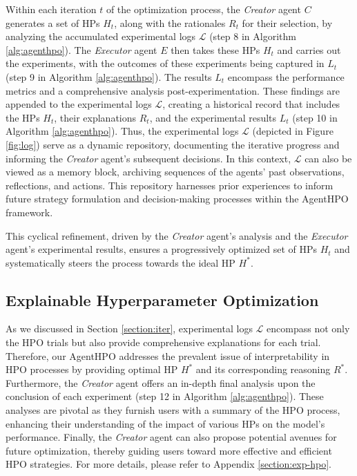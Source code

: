 \documentclass{article}
\begin{document}
Within each iteration \( t \) of the optimization process, the \textit{Creator} agent \( C \) generates a set of HPs \( H_t \), along with the rationales \( R_t \) for their selection, by analyzing the accumulated experimental logs \( \mathcal{L} \) (step 8 in Algorithm \ref{alg:agenthpo}). The \textit{Executor} agent \( E \) then takes these HPs \( H_t \) and carries out the experiments, with the outcomes of these experiments being captured in \( L_t \) (step 9 in Algorithm \ref{alg:agenthpo}). The results \( L_t \) encompass the performance metrics and a comprehensive analysis post-experimentation. These findings are appended to the experimental logs \( \mathcal{L} \), creating a historical record that includes the HPs \( H_t \), their explanations \( R_t \), and the experimental results \( L_t \) (step 10 in Algorithm \ref{alg:agenthpo}). Thus, the experimental logs \( \mathcal{L} \) (depicted in Figure \ref{fig:log}) serve as a dynamic repository, documenting the iterative progress and informing the \textit{Creator} agent's subsequent decisions. In this context, \( \mathcal{L} \) can also be viewed as a memory block, archiving sequences of the agents' past observations, reflections, and actions. This repository harnesses prior experiences to inform future strategy formulation and decision-making processes within the AgentHPO framework.

This cyclical refinement, driven by the \textit{Creator} agent's analysis and the \textit{Executor} agent's experimental results, ensures a progressively optimized set of HPs \( H_t \) and systematically steers the process towards the ideal HP \( H^* \).


\subsection{Explainable Hyperparameter Optimization}

As we discussed in Section \ref{section:iter}, experimental logs \( \mathcal{L} \) encompass not only the HPO trials but also provide comprehensive explanations for each trial. Therefore, our AgentHPO addresses the prevalent issue of interpretability in HPO processes by providing optimal HP \( H^* \) and its corresponding reasoning \( R^* \). Furthermore, the \textit{Creator} agent offers an in-depth final analysis upon the conclusion of each experiment (step 12 in Algorithm \ref{alg:agenthpo}). These analyses are pivotal as they furnish users with a summary of the HPO process, enhancing their understanding of the impact of various HPs on the model's performance. Finally, the \textit{Creator} agent can also propose potential avenues for future optimization, thereby guiding users toward more effective and efficient HPO strategies. For more details, please refer to Appendix \ref{section:exp-hpo}.
\end{document}
